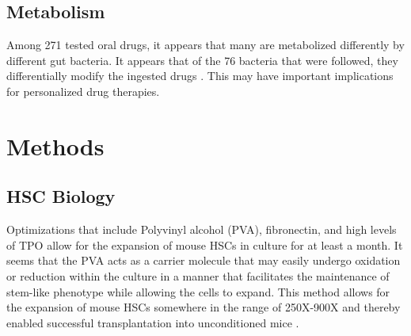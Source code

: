 \documentclass[]{book}
\begin{document}
\section{Metabolism}\label{metabolism}

Among 271 tested oral drugs, it appears that many are metabolized
differently by different gut bacteria. It appears that of the 76
bacteria that were followed, they differentially modify the ingested
drugs \citep{zimmermann2019mapping}. This may have important
implications for personalized drug therapies.

\chapter{Methods}\label{methods}

\section{HSC Biology}\label{hsc-biology}

Optimizations that include Polyvinyl alcohol (PVA), fibronectin, and
high levels of TPO allow for the expansion of mouse HSCs in culture for
at least a month. It seems that the PVA acts as a carrier molecule that
may easily undergo oxidation or reduction within the culture in a manner
that facilitates the maintenance of stem-like phenotype while allowing
the cells to expand. This method allows for the expansion of mouse HSCs
somewhere in the range of 250X-900X and thereby enabled successful
transplantation into unconditioned mice \citep{wilkinson2019long}.


\end{document}
